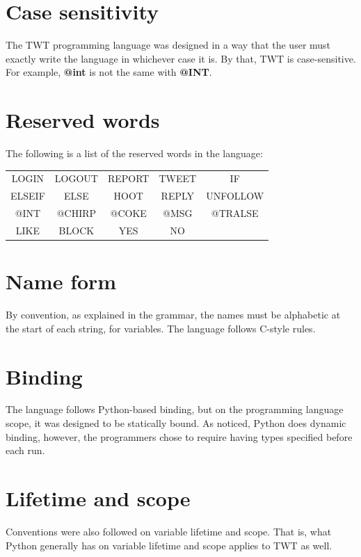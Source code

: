 \documentclass[11pt,a4paper]{report}
\begin{document}
\section{Case sensitivity}

The TWT programming language was designed in a way that the user must
exactly write the language in whichever case it is. By that, TWT is
case-sensitive. For example, \textbf{@int} is not the same with \textbf{@INT}.

\section{Reserved words}

The following is a list of the reserved words in the language:

\begin{center}
\begin{tabular}{ c c c c c }
 LOGIN & LOGOUT & REPORT & TWEET & IF \\ 
 ELSEIF & ELSE & HOOT & REPLY & UNFOLLOW \\  
 @INT & @CHIRP & @COKE & @MSG & @TRALSE \\
 LIKE & BLOCK & YES & NO
\end{tabular}
\end{center}

\section{Name form}

By convention, as explained in the grammar, the names must be alphabetic at the
start of each string, for variables. The language follows C-style rules.

\section{Binding}

The language follows Python-based binding, but on the programming language
scope, it was designed to be statically bound. As noticed, Python does dynamic
binding, however, the programmers chose to require having types specified before
each run.

\section{Lifetime and scope}

Conventions were also followed on variable lifetime and scope. That is, what
Python generally has on variable lifetime and scope applies to TWT as well.
\end{document}
